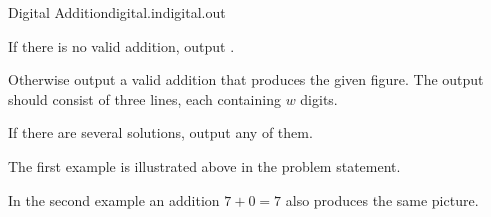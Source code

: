 \begin{problem}{Digital Addition}{digital.in}{digital.out}{\timeLimit}
\OutputFile

If there is no valid addition, output .

Otherwise output a valid addition that produces the given figure.
The output should consist of three lines, each containing $w$ digits.

If there are several solutions, output any of them.

\Examples

\begin{example}
%
%
%
\end{example}

The first example is illustrated above in the problem statement.

In the second example an addition $7+0=7$ also produces the same picture.

\end{problem}
